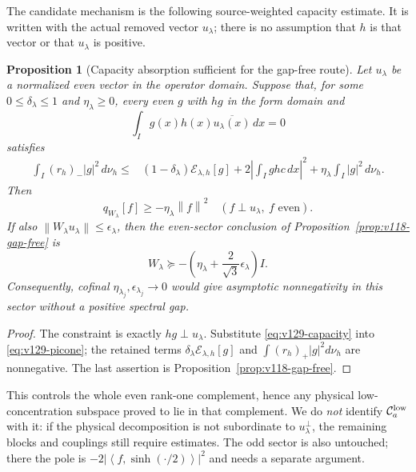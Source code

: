 \documentclass[11pt]{article}
\newtheorem{proposition}[theorem]{Proposition}
\theoremstyle{remark}
\newcommand{\norm}[1]{\left\lVert #1\right\rVert}
\newcommand{\ip}[2]{\left\langle #1,#2\right\rangle}
\begin{document}
The candidate mechanism is the following source-weighted capacity
estimate. It is written with the actual removed vector $u_\lambda$;
there is no assumption that $h$ is that vector or that $u_\lambda$ is
positive.

\begin{proposition}[Capacity absorption sufficient for the gap-free route]
\label{prop:v129-capacity}
Let $u_\lambda$ be a normalized even vector in the operator domain.
Suppose that, for some $0\le\delta_\lambda\le1$ and
$\eta_\lambda\ge0$, every even $g$ with $hg$ in the form domain and
\begin{equation}\label{eq:v129-constraint}
 \int_I g(x)h(x)\overline{u_\lambda(x)}\,dx=0
\end{equation}
satisfies
\begin{align}
 \int_I(r_h)_-|g|^2\,d\nu_h
 \le{}&(1-\delta_\lambda)\mathcal E_{\lambda,h}[g]
 +2\left|\int_I ghc\,dx\right|^2
 +\eta_\lambda\int_I|g|^2\,d\nu_h .
 \label{eq:v129-capacity}
\end{align}
Then
\[
 q_{W_\lambda}[f]\ge-\eta_\lambda\norm f^2
 \quad(f\perp u_\lambda,\ f\text{ even}).
\]
If also $\norm{W_\lambda u_\lambda}\le\epsilon_\lambda$, then the
even-sector conclusion of Proposition~\ref{prop:v118-gap-free} is
\begin{equation}\label{eq:v129-gapfree-conclusion}
 W_\lambda\succeq-\left(\eta_\lambda+\frac{2}{\sqrt3}
 \epsilon_\lambda\right)I.
\end{equation}
Consequently, cofinal $\eta_{\lambda_j},\epsilon_{\lambda_j}\to0$
would give asymptotic nonnegativity in this sector without a positive
spectral gap.
\end{proposition}
\begin{proof}
The constraint is exactly $hg\perp u_\lambda$. Substitute
\eqref{eq:v129-capacity} into \eqref{eq:v129-picone}; the retained
terms $\delta_\lambda\mathcal E_{\lambda,h}[g]$ and
$\int(r_h)_+|g|^2d\nu_h$ are nonnegative. The last assertion is
Proposition~\ref{prop:v118-gap-free}.
\end{proof}

This controls the whole even rank-one complement, hence any physical
low-concentration subspace proved to lie in that complement. We do
\emph{not} identify $\mathcal C_a^{\rm low}$ with it: if the physical
decomposition is not subordinate to $u_\lambda^\perp$, the remaining
blocks and couplings still require estimates. The odd sector is also
untouched; there the pole is
$-2|\ip f{\sinh(\cdot/2)}|^2$ and needs a separate argument.
\end{document}
